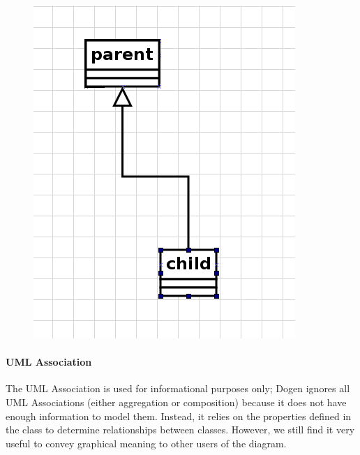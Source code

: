 \documentclass{book}
\begin{document}
\begin{figure}[H]
    \centering
    \includegraphics[scale=0.4]{images/generalization.png}
    \caption{}
\end{figure}

\paragraph{UML Association}

The UML Association is used for informational purposes only; Dogen
ignores all UML Associations (either aggregation or composition)
because it does not have enough information to model them. Instead, it
relies on the properties defined in the class to determine
relationships between classes. However, we still find it very useful
to convey graphical meaning to other users of the diagram.
\end{document}
